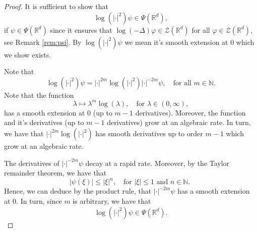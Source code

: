 \documentclass[10pt,a4paper]{amsart}
\newcommand{\N}{\mathbb{N}}
\newcommand{\R}{\mathbb{R}}
\begin{document}
\begin{proof}
	It is sufficient to show that 
	\begin{equation*}
		\log(|\cdot|^2)\psi\in \Psi(\R^d),
	\end{equation*}
	if $\psi\in \Psi(\R^d)$ since it ensures that $\log(-\Delta)\varphi \in \mathcal{Z}(\R^d)$ for all $\varphi\in \mathcal{Z}(\R^d)$, see Remark \ref{rem:psi}. By $\log(|\cdot|^2)\psi$ we mean it's smooth extension at $0$ which we show exists.
	
	Note that 
	\begin{equation*}
		\log(|\cdot|^2)\psi=		|\cdot|^{2m}\log(|\cdot|^2)|\cdot|^{-2m}\psi, \quad 
	\text{for all $m\in \N$.} 
	\end{equation*} 
	Note that the function
	\begin{equation*}
		\lambda \mapsto \lambda^m\log(\lambda), \quad \text{for $\lambda\in (0,\infty)$},
	\end{equation*}
	has a smooth extension at $0$ (up to $m-1$ derivatives). Moreover, the function and it's derivatives (up to $m-1$ derivatives) grow at an algebraic rate. In turn, we have that $|\cdot|^{2m}\log(|\cdot|^2)$ has smooth derivatives up to order $m-1$ which grow at an algebraic rate. 
	
	The derivatives of $|\cdot|^{-2m}\psi$ decay at a rapid rate. Moreover, by the Taylor remainder theorem, we have that 
	\begin{equation*}
	|\psi(\xi)|\leq |\xi|^n,\quad \text{for $|\xi|\leq 1$ and $n\in \N$. }
	\end{equation*}
	Hence, we can deduce by the product rule, that $|\cdot|^{-2m}\psi$ has a smooth extension at $0$. In turn, since $m$ is arbitrary, we have that 
		\begin{equation*}
	\log(|\cdot|^2)\psi\in \Psi(\R^d).
	\end{equation*}
\end{proof}
\end{document}
